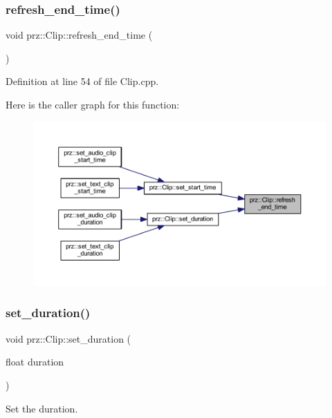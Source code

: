\subsubsection{\texorpdfstring{refresh\_end\_time()}{refresh\_end\_time()}}
{\footnotesize\ttfamily void prz\+::\+Clip\+::refresh\+\_\+end\+\_\+time (\begin{DoxyParamCaption}{ }\end{DoxyParamCaption})\hspace{0.3cm}{\ttfamily [protected]}}



Definition at line 54 of file Clip.\+cpp.

Here is the caller graph for this function\+:
\nopagebreak
\begin{figure}[H]
\begin{center}
\leavevmode
\includegraphics[width=350pt]{classprz_1_1_clip_a2b970808e50b0003a638c78ba6d26200_icgraph}
\end{center}
\end{figure}
\mbox{\label{classprz_1_1_clip_a7555fe34e45f6032ea282ca6d605ace6}} 
\subsubsection{\texorpdfstring{set\_duration()}{set\_duration()}}
{\footnotesize\ttfamily void prz\+::\+Clip\+::set\+\_\+duration (\begin{DoxyParamCaption}\item[{float}]{duration }\end{DoxyParamCaption})}



Set the duration. 


